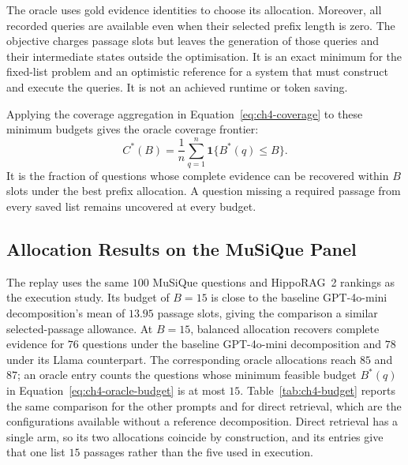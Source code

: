 The oracle uses gold evidence identities to choose its allocation. Moreover,
all recorded queries are available even when their selected prefix length is
zero. The objective charges passage slots but leaves the generation of those
queries and their intermediate states outside the optimisation. It is an exact
minimum for the fixed-list problem and an optimistic reference for a system
that must construct and execute the queries. It is not an achieved runtime or
token saving.

Applying the coverage aggregation in Equation~\ref{eq:ch4-coverage} to
these minimum budgets gives the oracle coverage frontier:
\begin{equation}
  C^*(B)=\frac{1}{n}\sum_{q=1}^{n}
  \mathbf{1}\{B^*(q)\leq B\}.
  \label{eq:ch4-oracle-frontier}
\end{equation}
It is the fraction of questions whose complete evidence can be recovered
within $B$ slots under the best prefix allocation. A question missing a
required passage from every saved list remains uncovered at every budget.

\subsection{Allocation Results on the MuSiQue Panel}
\label{sec:ch4-musique-budget}

The replay uses the same $100$ MuSiQue questions and HippoRAG~2 rankings as
the execution study. Its budget of $B=15$ is close to the baseline
GPT-4o-mini decomposition's mean of $13.95$ passage slots, giving the
comparison a similar selected-passage allowance. At $B=15$, balanced allocation
recovers complete evidence for $76$ questions under the baseline GPT-4o-mini
decomposition and $78$ under its Llama counterpart. The corresponding oracle
allocations reach $85$ and $87$; an oracle entry counts the questions whose
minimum feasible budget $B^*(q)$ in Equation~\ref{eq:ch4-oracle-budget} is at
most $15$. Table~\ref{tab:ch4-budget} reports the same comparison for the
other prompts and for direct retrieval, which are the configurations available
without a reference decomposition. Direct retrieval has a single arm, so its
two allocations coincide by construction, and its entries give that one list
$15$ passages rather than the five used in execution.

